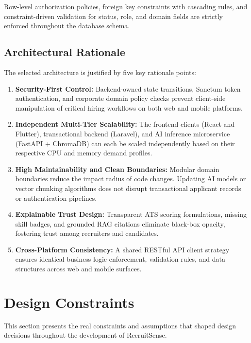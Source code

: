 Row-level authorization policies, foreign key constraints with cascading rules, and constraint-driven validation for status, role, and domain fields are strictly enforced throughout the database schema.

\subsection{Architectural Rationale}
The selected architecture is justified by five key rationale points:
\begin{enumerate}
    \item \textbf{Security-First Control:} Backend-owned state transitions, Sanctum token authentication, and corporate domain policy checks prevent client-side manipulation of critical hiring workflows on both web and mobile platforms.
    \item \textbf{Independent Multi-Tier Scalability:} The frontend clients (React and Flutter), transactional backend (Laravel), and AI inference microservice (FastAPI + ChromaDB) can each be scaled independently based on their respective CPU and memory demand profiles.
    \item \textbf{High Maintainability and Clean Boundaries:} Modular domain boundaries reduce the impact radius of code changes. Updating AI models or vector chunking algorithms does not disrupt transactional applicant records or authentication pipelines.
    \item \textbf{Explainable Trust Design:} Transparent ATS scoring formulations, missing skill badges, and grounded RAG citations eliminate black-box opacity, fostering trust among recruiters and candidates.
    \item \textbf{Cross-Platform Consistency:} A shared RESTful API client strategy ensures identical business logic enforcement, validation rules, and data structures across web and mobile surfaces.
\end{enumerate}

\section{Design Constraints}
This section presents the real constraints and assumptions that shaped design decisions throughout the development of RecruitSense.


